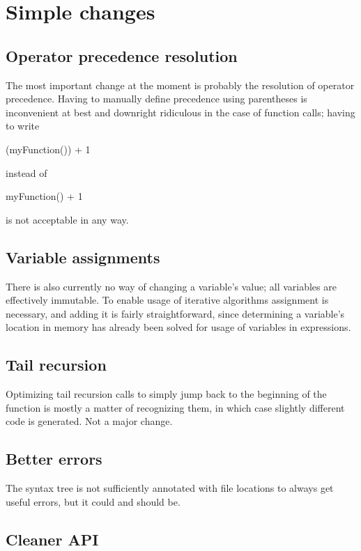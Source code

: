     \section{Simple changes}
    
    	\subsection{Operator precedence resolution}
    	
    	The most important change at the moment is probably the resolution of operator precedence. Having to manually define precedence using parentheses is inconvenient at best and downright ridiculous in the case of function calls; having to write
		\begin{perseuslisting}
(myFunction()) + 1
		\end{perseuslisting}
		instead of
		\begin{perseuslisting}
myFunction() + 1
		\end{perseuslisting}
		is not acceptable in any way.
		
		\subsection{Variable assignments}
		
		There is also currently no way of changing a variable's value; all variables are effectively immutable. To enable usage of iterative algorithms assignment is necessary, and adding it is fairly straightforward, since determining a variable's location in memory has already been solved for usage of variables in expressions.
		
		\subsection{Tail recursion}
		
		Optimizing tail recursion calls to simply jump back to the beginning of the function is mostly a matter of recognizing them, in which case slightly different code is generated. Not a major change.
		
		\subsection{Better errors}
		
		The syntax tree is not sufficiently annotated with file locations to always get useful errors, but it could and should be.
		
		\subsection{Cleaner API}
		
